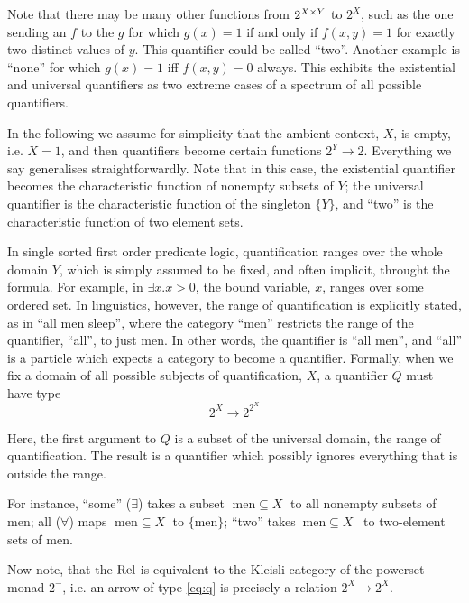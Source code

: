 Note that there may be many other functions from $2^{X\times Y}$ to $2^X$,
such as the one sending an $f$ to the $g$ for which
$g(x) = 1$ if and only if $f(x,y) = 1$ for exactly two distinct values
of $y$. This quantifier could be called ``two''. Another example is
``none'' for which $g(x)=1$ iff $f(x,y) = 0$ always. This exhibits the 
existential and universal quantifiers as two extreme cases of a
spectrum of all possible quantifiers.  

In the following we assume for simplicity that the ambient context,
$X$, is empty, i.e. $X = 1$, and then quantifiers become certain
functions $2^Y \to 2$. Everything we say generalises
straightforwardly.  Note that in this case, the existential quantifier
becomes the characteristic function of nonempty subsets of $Y$; the
universal quantifier is the characteristic function of the singleton
$\{Y\}$, and ``two'' is the characteristic function of two
element sets.

In single sorted first order predicate logic, quantification ranges
over the whole domain $Y$, which is simply assumed to be fixed, and
often implicit, throught the formula. For example, in $\exists x. x >
0$, the bound variable, $x$,
ranges over some ordered set. In linguistics, however, the range of
quantification is explicitly stated, as in ``all men sleep'', where
the category 
``men'' restricts the range of the quantifier, ``all'', to just
men. In other words, the quantifier is ``all men'', and ``all'' is a
particle which expects a category to become a quantifier. Formally,
when we fix a domain of all possible subjects of quantification, $X$,
a quantifier $Q$ must have type 
\begin{equation}\label{eq:q}
2^X \to 2^{2^X}
\end{equation}

Here, the first argument to $Q$ is a subset of the universal domain,
the range of quantification. The result is a quantifier which
possibly ignores everything that is outside the range. 

For instance, ``some'' ($\exists$) takes a subset
$\;\mathrm{men}\subseteq X\;$ to all nonempty subsets of men; all
($\forall$) maps $\;\mathrm{men}\subseteq X\;$ to $ \{ \mathrm{men}
\}$; ``two'' takes $~\mathrm{men} \subseteq X$~ to two-element sets of
men.

Now note, that the $\mathrm{Rel}$ is equivalent to the Kleisli category of the
powerset monad $2^-$, i.e. an arrow of type \eqref{eq:q} is precisely
a relation $2^X \to 2^X$. 


